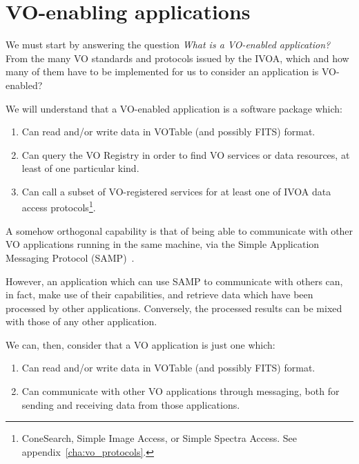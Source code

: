 	\section{VO-enabling applications} %
	\label{sec:vo_enabling_applications}
		
		We must start by answering the question \emph{What is a
		VO-enabled application?} From the many VO standards and
		protocols issued by the
		IVOA, which and how
		many of them have to be implemented for us to consider an
		application is VO-enabled?
		
		We will understand that a VO-enabled application is a
		software package which:
		
		\begin{enumerate}
			\item Can read and/or write data in VOTable (and
			possibly FITS) format.
			
			\item Can query the VO Registry in order to find
			VO services or data resources, at least of one
			particular kind.
			
			\item Can call a subset of VO-registered services
			for at least one of IVOA data access
			protocols\footnote{ConeSearch, Simple Image Access,
			or Simple Spectra Access. See 
			appendix~\ref{cha:vo_protocols}.}.
		\end{enumerate}
		
		A somehow orthogonal capability is that of being able to
		communicate with other VO applications running in the same
		machine, via the  Simple
		Application Messaging Protocol
		(SAMP)~\cite{2009samp.ivoav0904T}.
		
		However, an application which can use SAMP to communicate
		with others can, in fact, make use of their capabilities, and
		retrieve data which have been processed by other applications. Conversely, the
		processed results can be mixed with those of any other
		application.
		
		We can, then, consider that a VO application is just one
		which:
		
		\begin{enumerate}
			\item Can read and/or write data in VOTable (and
			possibly FITS) format.
			
			\item Can communicate with other VO applications
			through messaging, both for sending and receiving
			data from those applications.
		\end{enumerate}
		
